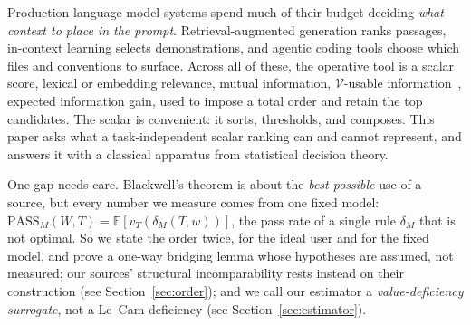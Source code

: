 \documentclass[11pt]{article}
\theoremstyle{plain}
\theoremstyle{definition}
\theoremstyle{remark}
\newcommand{\PASS}{\mathrm{PASS}}
\newcommand{\Vcal}{\mathcal{V}}
\begin{document}
Production language-model systems spend much of their budget deciding
\emph{what context to place in the prompt}. Retrieval-augmented generation ranks
passages, in-context learning selects demonstrations, and agentic coding tools
choose which files and conventions to surface. Across all of these, the
operative tool is a scalar score, lexical or embedding relevance,
mutual information, $\Vcal$-usable information~\citep{ethayarajh2022},
expected information gain, used to impose a total order and retain the top
candidates. The scalar is convenient: it sorts, thresholds, and composes. This paper asks what a
task-independent scalar ranking can and cannot represent, and answers it with a classical
apparatus from statistical decision theory.

One gap needs care. Blackwell's theorem is about the \emph{best possible} use
of a source, but every number we measure comes from one fixed model: $\PASS_M(W,T) =
\mathbb{E}[v_T(\delta_M(T,w))]$, the pass rate of a single rule $\delta_M$ that is not optimal. So
we state the order twice, for the ideal user and for the fixed model, and prove a one-way bridging
lemma whose hypotheses are assumed, not measured; our sources' structural incomparability rests
instead on their construction (see Section~\ref{sec:order}); and we call our estimator a
\emph{value-deficiency surrogate}, not a Le~Cam deficiency (see Section~\ref{sec:estimator}).
\end{document}
